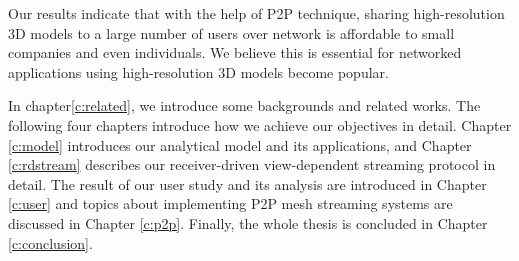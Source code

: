     Our results indicate that with the help of P2P technique,
    sharing high-resolution
    3D models to a large number of users over network is affordable
    to small companies and even individuals. We believe this is
    essential for networked applications using high-resolution 3D models
    become popular.

    In chapter\ref{c:related}, we introduce some backgrounds and related works.
    The following four chapters introduce how we achieve our objectives in detail.
    Chapter \ref{c:model} introduces our analytical model and its applications, and
    Chapter \ref{c:rdstream} describes our receiver-driven view-dependent streaming
    protocol in detail. The result of our user study and its analysis are introduced
    in Chapter \ref{c:user} and topics about implementing P2P mesh streaming systems
    are discussed in Chapter \ref{c:p2p}. Finally, the whole thesis is concluded in
    Chapter \ref{c:conclusion}.
